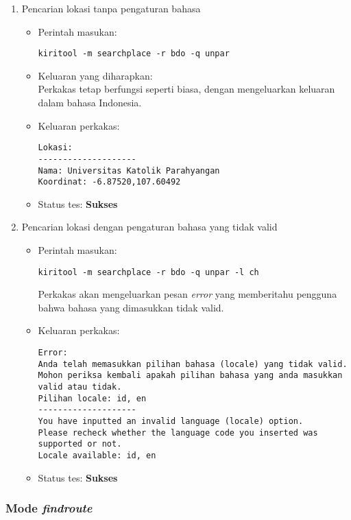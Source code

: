 \begin{enumerate}
	\item Pencarian lokasi tanpa pengaturan bahasa
	\begin{itemize}
		\item Perintah masukan:
		\begin{verbatim}
kiritool -m searchplace -r bdo -q unpar
		\end{verbatim}
		\item Keluaran yang diharapkan: \\
		Perkakas tetap berfungsi seperti biasa, dengan mengeluarkan keluaran dalam bahasa Indonesia.
		\item Keluaran perkakas:
		\begin{lstlisting}
Lokasi:
--------------------
Nama: Universitas Katolik Parahyangan
Koordinat: -6.87520,107.60492
		\end{lstlisting}
		\item Status tes: \textbf{Sukses}
	\end{itemize}
	
	\item Pencarian lokasi dengan pengaturan bahasa yang tidak valid
	\begin{itemize}
		\item Perintah masukan:
		\begin{verbatim}
kiritool -m searchplace -r bdo -q unpar -l ch
		\end{verbatim}
		Perkakas akan mengeluarkan pesan \textit{error} yang memberitahu pengguna bahwa bahasa yang dimasukkan tidak valid.
		\item Keluaran perkakas:
		\begin{lstlisting}
Error:
Anda telah memasukkan pilihan bahasa (locale) yang tidak valid.
Mohon periksa kembali apakah pilihan bahasa yang anda masukkan valid atau tidak.
Pilihan locale: id, en
--------------------
You have inputted an invalid language (locale) option.
Please recheck whether the language code you inserted was supported or not.
Locale available: id, en
		\end{lstlisting}
		\item Status tes: \textbf{Sukses}
	\end{itemize}
	
\end{enumerate}

\subsubsection{Mode \textit{findroute}}
\label{sec:testing-experiments-testing-findroute}

